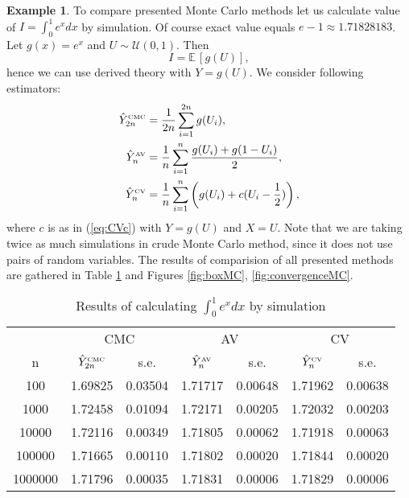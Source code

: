 \documentclass[a4paper,12pt, oneside]{book}
\theoremstyle{definition}
\newtheorem{example}{Example}[section]
\theoremstyle{remark}
\def\E{{\mathbb{E}}\,}
\def\CMC[#1]{\hat{Y}^{\hbox{\tiny CMC}}_{#1}}
\def\AV[#1]{\hat{Y}^{\hbox{\tiny AV}}_{#1}}
\def\CV[#1]{\hat{Y}^{\hbox{\tiny CV}}_{#1}}
\begin{document}
\begin{example}
To compare presented Monte Carlo methods let us calculate value of $I = \int_0^1 e^x dx$ by simulation. Of course exact value equals $e - 1 \approx 1.71828183$. Let $g(x) = e^x$ and $U \sim \mathcal{U}(0,1)$. Then 
\[ I = \E[g(U)], \]
 hence we can use derived theory with $Y = g(U)$. We consider following estimators:
 \begin{equation*}
  \begin{split}
   \CMC[2n] &= \frac{1}{2n} \sum\limits_{i=1}^{2n} g(U_i), \\
   \AV[n] &= \frac{1}{n} \sum\limits_{i=1}^{n} \frac{g(U_i) + g(1-U_i)}{2}, \\ 
   \CV[n] &= \frac{1}{n} \sum\limits_{i=1}^{n} \left( g(U_i) + c(U_i - \frac{1}{2}) \right),
  \end{split}
 \end{equation*}
where $c$ is as in (\ref{eq:CVc}) with $Y = g(U)$ and $X = U$. Note that we are taking twice as much simulations in crude Monte Carlo method, since it does not use pairs of random variables. The results of comparision of all presented methods are gathered in Table \ref{tab:MCcompare} and Figures \ref{fig:boxMC}, \ref{fig:convergenceMC}.

\begin{table}[h]
\centering
 \caption{Results of calculating $\int_0^1 e^x dx$ by simulation}
 \label{tab:MCcompare}
\begin{tabular} {||c | c | c | c | c |c | c ||}  
 \hline 
  & \multicolumn{2}{|c|}{ CMC } & \multicolumn{2}{|c|}{ AV } & \multicolumn{2}{|c|}{ CV } \\
  n & \multicolumn{1}{c}{ $\CMC[2n]$ } & \multicolumn{1}{c|}{ s.e. } & \multicolumn{1}{c}{ $\AV[n]$ } & \multicolumn{1}{c|}{ s.e. } & \multicolumn{1}{c}{ $\CV[n]$ } & \multicolumn{1}{c|}{ s.e. } \\ \hline \hline 
100    & 1.69825 & 0.03504 & 1.71717 & 0.00648 & 1.71962 & 0.00638 \\ \hline 
1000   & 1.72458 & 0.01094 & 1.72171 & 0.00205 & 1.72032 & 0.00203 \\ \hline 
10000  & 1.72116 & 0.00349 & 1.71805 & 0.00062 & 1.71918 & 0.00063 \\ \hline 
100000 & 1.71665 & 0.00110 & 1.71802 & 0.00020 & 1.71844 & 0.00020 \\ \hline 
1000000& 1.71796 & 0.00035 & 1.71831 & 0.00006 & 1.71829 & 0.00006 \\ \hline 
\end{tabular}  
\end{table}


\end{example}
\end{document}
